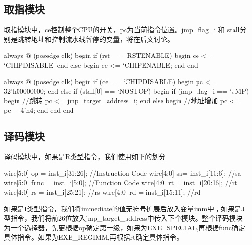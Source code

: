     \subsection{取指模块} \label{sec:qzmk}
    取指模块中，ce控制整个CPU的开关，pc为当前指令位置。jmp\_flag\_i 和 stall分别是跳转地址和控制流水线暂停的变量，将在后文讨论。
    \begin{verilog}
    always @ (posedge clk) begin
		if (rst == `RSTENABLE) begin
			ce <= `CHIPDISABLE;
		end else begin
			ce <= `CHIPENABLE;
		end
	end
		
	always @ (posedge clk) begin
		if (ce == `CHIPDISABLE) begin
			pc <= 32'h00000000;
		end else if (stall[0] == `NOSTOP) begin
			if (jmp_flag_i == `JMP) begin //跳转
				pc <= jmp_target_address_i;
			end else begin //地址增加
				pc <= pc + 4'h4;
			end
		end
    end
    \end{verilog}

    \subsection{译码模块} \label{sec:ymmk}
    译码模块中，如果是R类型指令，我们使用如下的划分
    \begin{verilog}
        wire[5:0] op = inst_i[31:26]; //Instruction Code
        wire[4:0] sa= inst_i[10:6];   //sa
        wire[5:0] func = inst_i[5:0]; //Function Code
        wire[4:0] rt = inst_i[20:16]; //rt
        wire[4:0] rs = inst_i[25:21]; //rs
        wire[4:0] rd = inst_i[15:11]; //rd
    \end{verilog}
    如果是I类型指令，我们将immediate的值无符号扩展后放入变量imm中；如果是J型指令，我们将前26位放入jmp\_target\_address中传入下个模块。整个译码模块为一个选择器，先更根据op确定第一级，如果为EXE\_SPECIAL,再根据func确定具体指令。如果为EXE\_REGIMM,再根据rt确定具体指令。
    
